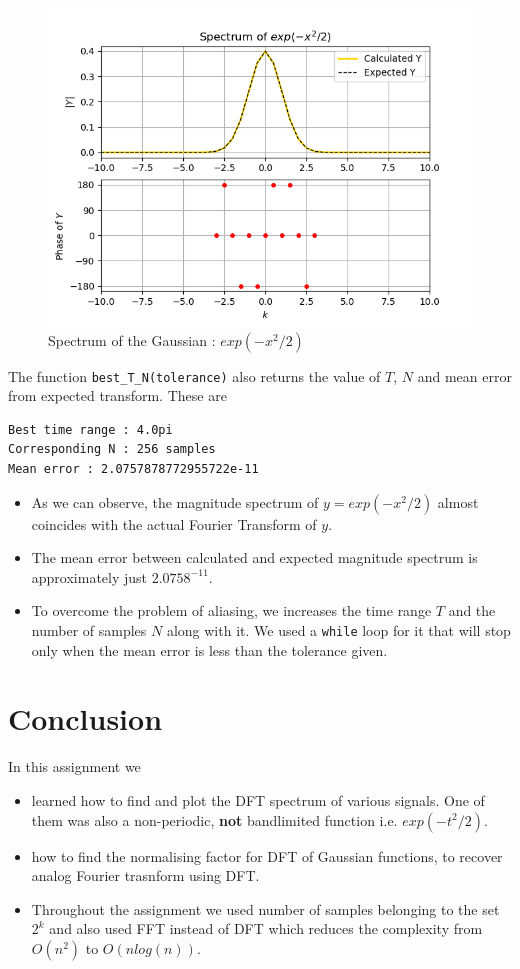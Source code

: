 \documentclass[11pt, a4paper]{article}
\begin{document}
    \begin{figure}[!h]
        \centering
        \includegraphics[scale = 0.7]{Figure 8.png}
        \caption{Spectrum of the Gaussian : $exp(-x^2/2)$}
        \label{fig:Figure 8}
    \end{figure}
    The function \texttt{best\_T\_N(tolerance)} also returns the value of $T$, $N$ and mean error from expected transform. These are
    \begin{verbatim}
Best time range : 4.0pi
Corresponding N : 256 samples
Mean error : 2.0757878772955722e-11
    \end{verbatim}
    \begin{itemize}
        \item As we can observe, the magnitude spectrum of $y = exp(-x^2/2)$ almost coincides with the actual Fourier Transform of $y$.
        \item The mean error between calculated and expected magnitude spectrum is approximately just $2.0758^{-11}$.
        \item To overcome the problem of aliasing, we increases the time range $T$ and the number of samples $N$ along with it. We used a \texttt{while} loop for it that will stop only when the mean error is less than the tolerance given.
    \end{itemize}
\section{Conclusion}
In this assignment we
\begin{itemize}
    \item learned how to find and plot the DFT spectrum of various signals. One of them was also a non-periodic, \textbf{not} bandlimited function i.e. $exp(-t^2/2)$.
    \item how to find the normalising factor for DFT of Gaussian functions, to recover analog Fourier trasnform using DFT.
    \item Throughout the assignment we used number of samples belonging to the set $2^k$ and also used FFT instead of DFT which reduces the complexity from $O(n^2)$ to $O(nlog(n))$.
\end{itemize}
 
\end{document}
